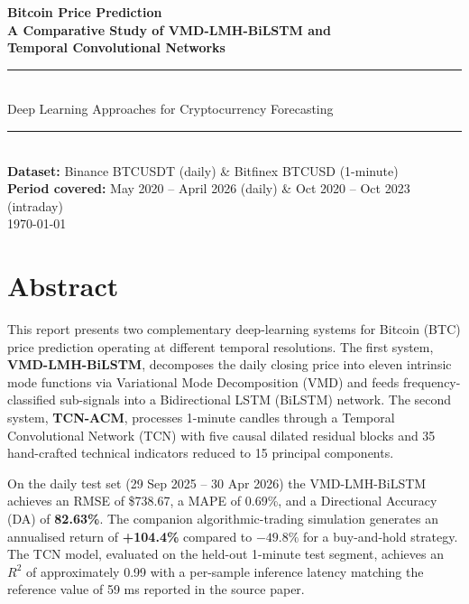 \documentclass[12pt,a4paper]{article}
\begin{document}
\begin{titlepage}
  \centering
  \vspace*{2cm}
  {\Huge\bfseries\color{darkblue} Bitcoin Price Prediction\\[0.4em]
   \large\color{btcgold} A Comparative Study of VMD-LMH-BiLSTM and\\
   Temporal Convolutional Networks}\\[2cm]

  \rule{\linewidth}{0.4mm}\\[0.5em]
  {\large Deep Learning Approaches for Cryptocurrency Forecasting}\\
  \rule{\linewidth}{0.4mm}\\[2cm]

  {\large\textbf{Dataset:} Binance BTCUSDT (daily) \&  Bitfinex BTCUSD (1-minute)}\\[0.5em]
  {\large\textbf{Period covered:} May 2020 -- April 2026 (daily) \&
   Oct 2020 -- Oct 2023 (intraday)}\\[2cm]

  \vfill
  {\large\today}
\end{titlepage}

\tableofcontents
\newpage

\section{Abstract}
\label{sec:abstract}

This report presents two complementary deep-learning systems for Bitcoin (BTC)
price prediction operating at different temporal resolutions.  The first system,
\textbf{VMD-LMH-BiLSTM}, decomposes the daily closing price into eleven
intrinsic mode functions via Variational Mode Decomposition (VMD) and feeds
frequency-classified sub-signals into a Bidirectional LSTM (BiLSTM) network.
The second system, \textbf{TCN-ACM}, processes 1-minute candles through a
Temporal Convolutional Network (TCN) with five causal dilated residual blocks
and 35 hand-crafted technical indicators reduced to 15 principal components.

On the daily test set (29 Sep 2025 -- 30 Apr 2026) the VMD-LMH-BiLSTM
achieves an RMSE of \$738.67, a MAPE of 0.69\%, and a Directional Accuracy
(DA) of \textbf{82.63\%}.  The companion algorithmic-trading simulation
generates an annualised return of \textbf{+104.4\%} compared to
$-49.8\%$ for a buy-and-hold strategy.  The TCN model, evaluated on the
held-out 1-minute test segment, achieves an $R^2$ of approximately 0.99 with
a per-sample inference latency matching the reference value of 59 ms reported
in the source paper.
\end{document}
